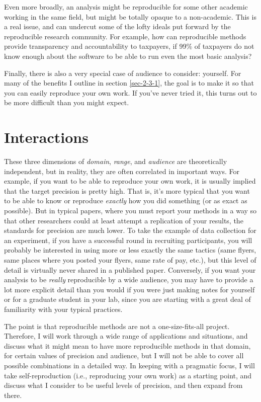 \documentclass{book}
\begin{document}
Even more broadly, an analysis might be reproducible for some other academic working in the same field, but might be totally opaque to a non-academic.  This is a real issue, and can undercut some of the lofty ideals put forward by the reproducible research community.  For example, how can reproducible methods provide transparency and accountability to taxpayers, if 99\% of taxpayers do not know enough about the software to be able to run even the most basic analysis?

Finally, there is also a very special case of audience to consider: yourself.  For many of the benefits I outline in section \ref{sec-2-3-1}, the goal is to make it so that you can easily reproduce your own work.  If you've never tried it, this turns out to be more difficult than you might expect.
\section{Interactions}
\label{sec-3-4}

These three dimensions of \emph{domain}, \emph{range}, and \emph{audience} are theoretically independent, but in reality, they are often correlated in important ways.  For example, if you want to be able to reproduce your own work, it is usually implied that the target precision is pretty high. That is, it's more typical that you want to be able to know or reproduce \emph{exactly} how you did something (or as exact as possible).  But in typical papers, where you must report your methods in a way so that other researchers could at least attempt a replication of your results, the standards for precision are much lower. To take the example of data collection for an experiment, if you have a successful round in recruiting participants, you will probably be interested in using more or less exactly the same tactics (same flyers, same places where you posted your flyers, same rate of pay, etc.), but this level of detail is virtually never shared in a published paper.  Conversely, if you want your analysis to be \emph{really} reproducible by a wide audience, you may have to provide a lot more explicit detail than you would if you were just making notes for yourself or for a graduate student in your lab, since you are starting with a great deal of familiarity with your typical practices. 

The point is that reproducible methods are not a one-size-fits-all project. Therefore, I will work through a wide range of applications and situations, and discuss what it might mean to have more reproducible methods in that domain, for certain values of precision and audience, but I will not be able to cover all possible combinations in a detailed way. In keeping with a pragmatic focus, I will take self-reproduction (i.e., reproducing your own work) as a starting point, and discuss what I consider to be useful levels of precision, and then expand from there. 
\end{document}
